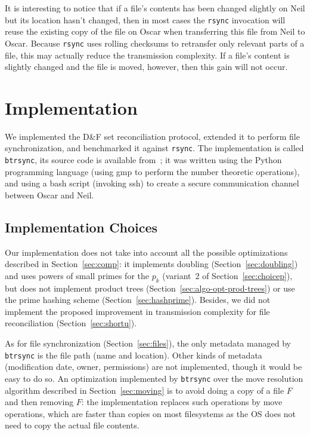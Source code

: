 \documentclass[twoside,envcountsame,runningheads]{llncs}
\newcommand{\df}{D\&F\xspace}
\newcommand{\btrsync}{\texttt{btrsync}\xspace}
\newcommand{\rsync}{\texttt{rsync}\xspace}
\begin{document}
It is interesting to notice that if a file's contents has been changed slightly on Neil but its location hasn't changed, then in most cases the \rsync invocation will reuse the existing copy of the file on Oscar when transferring this file from Neil to Oscar. Because \rsync uses rolling checksums to retransfer only relevant parts of a file, this may actually reduce the transmission complexity. If a file's content is slightly changed and the file is moved, however, then this gain will not occur.

\section{Implementation}
\label{sec:program}

We implemented the \df set reconciliation protocol, extended it to perform file
synchronization, and benchmarked it against \rsync. The implementation is called
\btrsync, its source code is available from~\cite{Robin}; it was written using
the Python programming language (using {\sf gmp} to perform the number theoretic
operations), and using a bash script (invoking ssh) to create a secure communication
channel between Oscar and Neil.

\subsection{Implementation Choices}

Our implementation does not take into account all the possible optimizations
described in Section~\ref{sec:comp}: it implements doubling
(Section~\ref{sec:doubling}) and uses powers of small primes for the $p_k$
(variant~2 of Section~\ref{sec:choicep}), but does not implement product trees
(Section~\ref{sec:algo-opt-prod-trees}) or use the prime hashing scheme
(Section~\ref{sec:hashprime}).
Besides, we did not implement the proposed improvement in transmission complexity for file reconciliation (Section~\ref{sec:shortu}).

As for file synchronization (Section~\ref{sec:files}), the only metadata managed by
\btrsync is the file path (name and location). Other kinds of metadata
(modification date, owner, permissions) are not implemented, though it would be
easy to do so. An optimization implemented by \btrsync over the move resolution algorithm described in Section~\ref{sec:moving} is to avoid doing a copy of a file $F$ and then removing $F$: the implementation replaces such operations by move operations, which are faster than copies on most filesystems as the OS does not need to copy the actual file contents.
\end{document}
